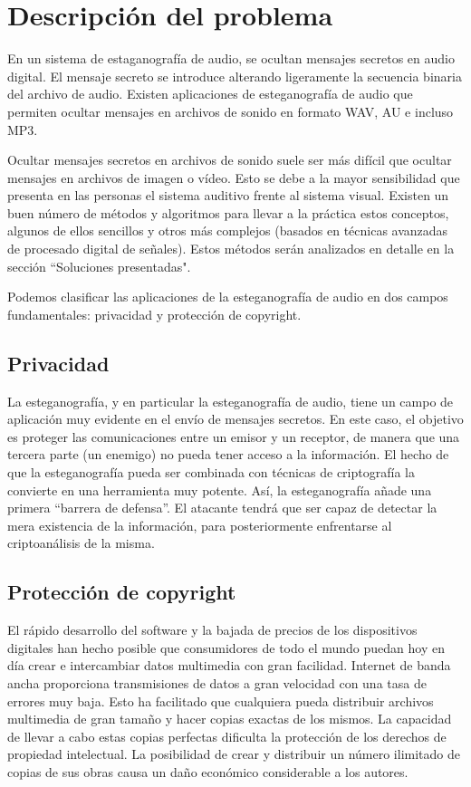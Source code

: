\documentclass[12pt]{article}
\begin{document}
\newpage
\section{Descripción del problema}

En un sistema de estaganografía de audio, se ocultan mensajes secretos en audio digital. El mensaje secreto se introduce alterando ligeramente la secuencia binaria del archivo de audio. Existen aplicaciones de esteganografía de audio que permiten ocultar mensajes en archivos de sonido en formato WAV, AU e incluso MP3.

Ocultar mensajes secretos en archivos de sonido suele ser más difícil que ocultar mensajes en archivos de imagen o vídeo. Esto se debe a la mayor sensibilidad que presenta en las personas el sistema auditivo frente al sistema visual. Existen un buen número de métodos y algoritmos para llevar a la práctica estos conceptos, algunos de ellos sencillos y otros más complejos (basados en técnicas avanzadas de procesado digital de señales). Estos métodos serán analizados en detalle en la sección ``Soluciones presentadas".

Podemos clasificar las aplicaciones de la esteganografía de audio en dos campos fundamentales: privacidad y protección de copyright.

\subsection{Privacidad}

La esteganografía, y en particular la esteganografía de audio, tiene un campo de aplicación muy evidente en el envío de mensajes secretos. En este caso, el objetivo es proteger las comunicaciones entre un emisor y un receptor, de manera que una tercera parte (un enemigo) no pueda tener acceso a la información. El hecho de que la esteganografía pueda ser combinada con técnicas de criptografía la convierte en una herramienta muy potente. Así, la esteganografía añade una primera ``barrera de defensa''. El atacante tendrá que ser capaz de detectar la mera existencia de la información, para posteriormente enfrentarse al criptoanálisis de la misma.

\subsection{Protección de copyright}

El rápido desarrollo del software y la bajada de precios de los dispositivos digitales han hecho posible que consumidores de todo el mundo puedan hoy en día crear e intercambiar datos multimedia con gran facilidad. Internet de banda ancha proporciona transmisiones de datos a gran velocidad con una tasa de errores muy baja. Esto ha facilitado que cualquiera pueda distribuir archivos multimedia de gran tamaño y hacer copias exactas de los mismos. La capacidad de llevar a cabo estas copias perfectas dificulta la protección de los derechos de propiedad intelectual. La posibilidad de crear y distribuir un número ilimitado de copias de sus obras causa un daño económico considerable a los autores.
\end{document}
